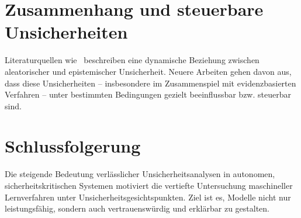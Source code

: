 \section{Zusammenhang und steuerbare Unsicherheiten}

Literaturquellen wie~\parencite{ArthurHoarau2025} beschreiben eine dynamische Beziehung zwischen aleatorischer und epistemischer Unsicherheit. Neuere Arbeiten gehen davon aus, dass diese Unsicherheiten – insbesondere im Zusammenspiel mit evidenzbasierten Verfahren – unter bestimmten Bedingungen gezielt beeinflussbar bzw. steuerbar sind.

\section{Schlussfolgerung}

Die steigende Bedeutung verlässlicher Unsicherheitsanalysen in autonomen, sicherheitskritischen Systemen motiviert die vertiefte Untersuchung maschineller Lernverfahren unter Unsicherheitsgesichtspunkten. Ziel ist es, Modelle nicht nur leistungsfähig, sondern auch vertrauenswürdig und erklärbar zu gestalten.
